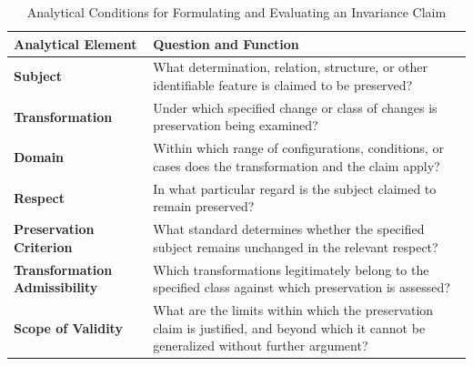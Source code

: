 \begin{table}[htbp]
    \centering

    \caption{
        Analytical Conditions for Formulating and Evaluating
        an Invariance Claim
    }
    \label{tab:conditions-of-an-invariance-claim}

    \vspace{0.5em}

    \small

    \renewcommand{\arraystretch}{1.45}

    \begin{tabular}{
        |p{}
        |p{}|
    }
        \hline

        \textbf{Analytical Element}
        &
        \textbf{Question and Function}
        \\ \hline

        \textbf{Subject}
        &
        What determination, relation, structure, or other
        identifiable feature is claimed to be preserved?
        \\ \hline

        \textbf{Transformation}
        &
        Under which specified change or class of changes
        is preservation being examined?
        \\ \hline

        \textbf{Domain}
        &
        Within which range of configurations, conditions,
        or cases does the transformation and the claim apply?
        \\ \hline

        \textbf{Respect}
        &
        In what particular regard is the subject claimed
        to remain preserved?
        \\ \hline

        \textbf{Preservation Criterion}
        &
        What standard determines whether the specified
        subject remains unchanged in the relevant respect?
        \\ \hline

        \textbf{Transformation Admissibility}
        &
        Which transformations legitimately belong to the
        specified class against which preservation is assessed?
        \\ \hline

        \textbf{Scope of Validity}
        &
        What are the limits within which the preservation
        claim is justified, and beyond which it cannot
        be generalized without further argument?
        \\ \hline


\end{tabular}
\end{table}
